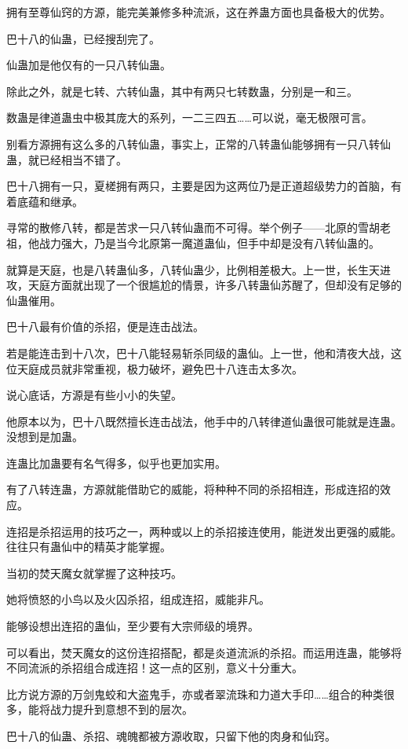 \begin{this_body}
拥有至尊仙窍的方源，能完美兼修多种流派，这在养蛊方面也具备极大的优势。

巴十八的仙蛊，已经搜刮完了。

仙蛊加是他仅有的一只八转仙蛊。

除此之外，就是七转、六转仙蛊，其中有两只七转数蛊，分别是一和三。

数蛊是律道蛊虫中极其庞大的系列，一二三四五……可以说，毫无极限可言。

别看方源拥有这么多的八转仙蛊，事实上，正常的八转蛊仙能够拥有一只八转仙蛊，就已经相当不错了。

巴十八拥有一只，夏槎拥有两只，主要是因为这两位乃是正道超级势力的首脑，有着底蕴和继承。

寻常的散修八转，都是苦求一只八转仙蛊而不可得。举个例子——北原的雪胡老祖，他战力强大，乃是当今北原第一魔道蛊仙，但手中却是没有八转仙蛊的。

就算是天庭，也是八转蛊仙多，八转仙蛊少，比例相差极大。上一世，长生天进攻，天庭方面就出现了一个很尴尬的情景，许多八转蛊仙苏醒了，但却没有足够的仙蛊催用。

巴十八最有价值的杀招，便是连击战法。

若是能连击到十八次，巴十八能轻易斩杀同级的蛊仙。上一世，他和清夜大战，这位天庭成员就非常重视，极力破坏，避免巴十八连击太多次。

说心底话，方源是有些小小的失望。

他原本以为，巴十八既然擅长连击战法，他手中的八转律道仙蛊很可能就是连蛊。没想到是加蛊。

连蛊比加蛊要有名气得多，似乎也更加实用。

有了八转连蛊，方源就能借助它的威能，将种种不同的杀招相连，形成连招的效应。

连招是杀招运用的技巧之一，两种或以上的杀招接连使用，能迸发出更强的威能。往往只有蛊仙中的精英才能掌握。

当初的焚天魔女就掌握了这种技巧。

她将愤怒的小鸟以及火囚杀招，组成连招，威能非凡。

能够设想出连招的蛊仙，至少要有大宗师级的境界。

可以看出，焚天魔女的这份连招搭配，都是炎道流派的杀招。而运用连蛊，能够将不同流派的杀招组合成连招！这一点的区别，意义十分重大。

比方说方源的万剑鬼蛟和大盗鬼手，亦或者翠流珠和力道大手印……组合的种类很多，能将战力提升到意想不到的层次。

巴十八的仙蛊、杀招、魂魄都被方源收取，只留下他的肉身和仙窍。


\end{this_body}
